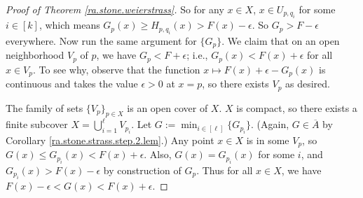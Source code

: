 \begin{proof}[Proof of Theorem \ref{ra.stone.weierstrass}]
So for any \(x \in X\), \(x \in U_{p,q_i}\) for some \(i \in [k]\), which means \(G_p(x) \geq H_{p, q_i}(x) > F(x) - \epsilon\). So \(G_p > F - \epsilon\) everywhere. Now run the same argument for \(\{G_p\}\). We claim that on an open neighborhood \(V_p\) of \(p\), we have \(G_p < F + \epsilon\); i.e., \(G_p(x) < F(x) + \epsilon\) for all \(x \in V_p\). To see why, observe that the function \(x \mapsto F(x) + \epsilon - G_p(x)\) is continuous and takes the value \(\epsilon > 0\) at \(x = p\), so there exists \(V_p\) as desired.

The family of sets \(\{V_p\}_{p \in X}\) is an open cover of \(X\). \(X\) is compact, so there exists a finite subcover \(X = \bigcup_{i=1}^\ell V_{p_i}\). Let \(G := \min_{i \in [\ell]} \{G_{p_i}\}\). (Again, \(G \in \overline{A}\) by Corollary \ref{ra.stone.strass.step.2.lem}.) Any point \(x \in X\) is in some \(V_p\), so \(G(x) \leq G_{p_i}(x) < F(x) + \epsilon\). Also, \(G(x) = G_{p_i}(x)\) for some \(i\), and \(G_{p_i}(x) > F(x) - \epsilon\) by construction of \(G_p\). Thus for all \(x \in X\), we have \(F(x) - \epsilon < G(x) < F(x) + \epsilon\).


%

\end{proof}




